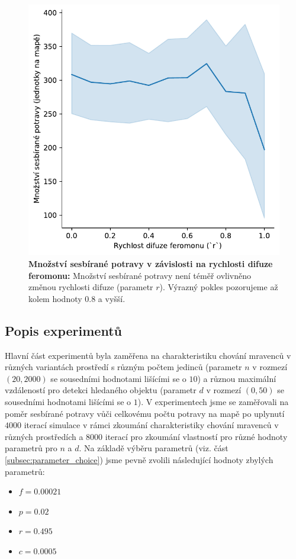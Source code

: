 \documentclass[10pt,a4paper,twocolumn]{article}
\begin{document}
\begin{figure}[tb]
  \centering
  \includegraphics[width=0.9\linewidth]{images/grid_search_2_difusion.pdf}
  \caption{\textbf{Množství sesbírané potravy v závislosti na rychlosti difuze feromonu: }
  Množství sesbírané potravy není téměř ovlivněno změnou rychlosti 
  difuze (parametr $r$). Výrazný pokles pozorujeme až kolem hodnoty $0.8$ 
  a vyšší.}
  \label{fig:grid_search_2_difusion}
\end{figure}


\subsection{Popis experimentů}
\label{subsec:experiment_describtion} 
Hlavní část experimentů byla zaměřena na charakteristiku chování mravenců v
různých variantách prostředí s různým počtem jedinců (parametr $n$ v rozmezí 
$(20, 2000)$ se sousedními hodnotami lišícími se o $10$) a různou 
maximální vzdáleností pro detekci hledaného objektu 
(parametr $d$ v rozmezí $(0, 50)$ se sousedními hodnotami lišícími se o $1$). 
V experimentech jsme se zaměřovali na poměr sesbírané potravy vůči celkovému 
počtu potravy na mapě po uplynutí
$4000$ iterací simulace v rámci zkoumání charakteristiky chování mravenců
v různých prostředích a $8000$ iterací pro zkoumání vlastností pro různé hodnoty
parametrů pro $n$ a $d$. Na základě výběru parametrů 
(viz. část \ref{subsec:parameter_choice}) jsme 
pevně zvolili následující hodnoty zbylých parametrů:

\begin{itemize}
  \item $f = 0.00021$
  \item $p = 0.02$
  \item $r = 0.495$
  \item $c = 0.0005$
\end{itemize}




\end{document}
